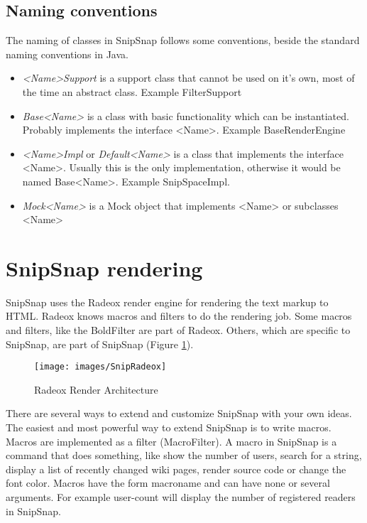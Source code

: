 \documentclass[a4paper,pdftex]{article}
\begin{document}

\subsection{Naming conventions}

The naming of classes in SnipSnap follows some conventions, beside the standard naming conventions
in Java.

\begin{itemize}
\item \textit{<Name>Support} is a support class that cannot be used on it's own, most of the time an abstract class. Example FilterSupport
\item \textit{Base<Name>} is a class with basic functionality which can be instantiated. Probably implements the interface <Name>. Example BaseRenderEngine
\item \textit{<Name>Impl} or \textit{Default<Name>} is a class that implements the interface <Name>. Usually this is the only implementation, otherwise it would be named Base<Name>. Example SnipSpaceImpl.
\item \textit{Mock<Name>} is a Mock object that implements <Name> or subclasses <Name>
\end{itemize}

\section{SnipSnap rendering}

SnipSnap uses the Radeox\cite{Radeox} render engine for rendering the text markup to HTML.
Radeox knows macros and filters to do the rendering job. Some macros and filters, like the BoldFilter
are part of Radeox. Others, which are specific to SnipSnap, are part of SnipSnap (Figure \ref{Architecture}).

\begin{figure}[ht]
  \centering
    \texttt{[image: images/SnipRadeox]}
     \caption{\small\textsf Radeox Render Architecture}
     \label{Architecture}
\end{figure}

There are several ways to extend and customize SnipSnap with your own ideas.
The easiest and most powerful way to extend SnipSnap is to write macros. Macros
are implemented as a filter (MacroFilter). A macro in SnipSnap is a command
that does something, like show the number of users, search for a string, display
a list of recently changed wiki pages, render source code or change the
font color. Macros have the form {macroname} and can have none or several
arguments. For example {user-count} will display the number of registered
readers in SnipSnap. 
\end{document}
